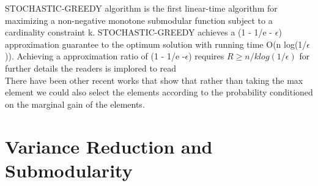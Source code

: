 \documentclass[a4paper,twoside]{iiththesis}
\theoremstyle{definition}
\theoremstyle{definition}
\theoremstyle{remark}
\begin{document}
STOCHASTIC-GREEDY algorithm is the  first linear-time algorithm for maximizing a non-negative monotone submodular function subject to a cardinality constraint k. STOCHASTIC-GREEDY achieves a (1 - 1/e - $\epsilon$) approximation guarantee to the optimum solution with running time O(n log(1/$\epsilon$)). Achieving a approximation ratio of (1 - 1/e -$ \epsilon$) requires $R \geq n/k log(1/\epsilon)$ for further details the readers is implored to read \cite{mirzasoleiman2015lazier}\\
There have been other recent works \cite{tschiatschek2018differentiable} that show that rather than taking the max element we could also select the elements according to the probability conditioned on the marginal gain of the elements. 


\section{Variance Reduction and Submodularity }
\end{document}
